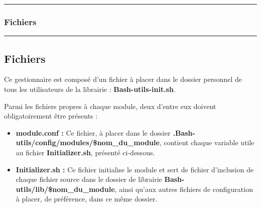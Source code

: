 \documentclass[a4paper,10pt]{article}
\begin{document}
\begin{justify}

\end{justify}



\color{blue}\par\noindent\rule{\textwidth}{0.4pt}\color{white}

\color{blue}
\subsubsection{Fichiers}\color{white}

\begin{justify}

\end{justify}




\color{green}\par\noindent\rule{\textwidth}{0.4pt}\color{white}

\color{green}
\subsection{Fichiers}\color{white}

\begin{justify}
    Ce gestionnaire est composé d'un fichier à placer dans le dossier personnel de tous les utilisateurs de la librairie :  \textbf{\color{lime}Bash-utils-init.sh}.
\end{justify}

\begin{justify}
    Parmi les fichiers propres à chaque module, deux d'entre eux doivent obligatoirement être présents :

    \begin{itemize}
        \item \textbf{\color{lime}module.conf\color{white} :} Ce fichier, à placer dans le dossier \textbf{\color{lime}.Bash-utils/config/modules/\$nom\_du\_module}, contient chaque variable utile au fichier \textbf{\color{lime}Initializer.sh}, présenté ci-dessous.\\

        \item \textbf{\color{lime}Initializer.sh\color{white} :} Ce fichier initialise le module et sert de fichier d'inclusion de chaque fichier source dans le dossier de librairie \textbf{\color{lime}Bash-utils/lib/\$nom\_du\_module}, ainsi qu'aux autres fichiers de configuration à placer, de préférence, dans ce même dossier.
    \end{itemize}
\end{justify}
\end{document}
